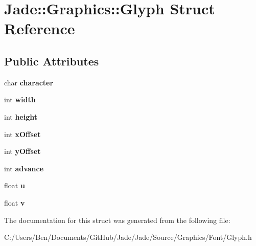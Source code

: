 \hypertarget{struct_jade_1_1_graphics_1_1_glyph}{}\section{Jade\+:\+:Graphics\+:\+:Glyph Struct Reference}
\label{struct_jade_1_1_graphics_1_1_glyph}
\subsection*{Public Attributes}
\begin{DoxyCompactItemize}
\item 
\hypertarget{struct_jade_1_1_graphics_1_1_glyph_af138396cfdec108c776fa599a14ba1e4}{}char {\bfseries character}\label{struct_jade_1_1_graphics_1_1_glyph_af138396cfdec108c776fa599a14ba1e4}

\item 
\hypertarget{struct_jade_1_1_graphics_1_1_glyph_a9b2276dc59b681731d0514a518fc672b}{}int {\bfseries width}\label{struct_jade_1_1_graphics_1_1_glyph_a9b2276dc59b681731d0514a518fc672b}

\item 
\hypertarget{struct_jade_1_1_graphics_1_1_glyph_a184d5d7e52652dedc12e22daf1aba744}{}int {\bfseries height}\label{struct_jade_1_1_graphics_1_1_glyph_a184d5d7e52652dedc12e22daf1aba744}

\item 
\hypertarget{struct_jade_1_1_graphics_1_1_glyph_a7622231925e54848d31ebbf3285bec61}{}int {\bfseries x\+Offset}\label{struct_jade_1_1_graphics_1_1_glyph_a7622231925e54848d31ebbf3285bec61}

\item 
\hypertarget{struct_jade_1_1_graphics_1_1_glyph_a5f16756ac11d5dfd697ad877c208dd96}{}int {\bfseries y\+Offset}\label{struct_jade_1_1_graphics_1_1_glyph_a5f16756ac11d5dfd697ad877c208dd96}

\item 
\hypertarget{struct_jade_1_1_graphics_1_1_glyph_a081f1bbf645e08811dea4bcf50a60c59}{}int {\bfseries advance}\label{struct_jade_1_1_graphics_1_1_glyph_a081f1bbf645e08811dea4bcf50a60c59}

\item 
\hypertarget{struct_jade_1_1_graphics_1_1_glyph_a83aa50d0eba411475adebb795d731b2e}{}float {\bfseries u}\label{struct_jade_1_1_graphics_1_1_glyph_a83aa50d0eba411475adebb795d731b2e}

\item 
\hypertarget{struct_jade_1_1_graphics_1_1_glyph_a3b15cafd58a0dd8b9aff8261e69e2946}{}float {\bfseries v}\label{struct_jade_1_1_graphics_1_1_glyph_a3b15cafd58a0dd8b9aff8261e69e2946}

\end{DoxyCompactItemize}


The documentation for this struct was generated from the following file\+:\begin{DoxyCompactItemize}
\item 
C\+:/\+Users/\+Ben/\+Documents/\+Git\+Hub/\+Jade/\+Jade/\+Source/\+Graphics/\+Font/Glyph.\+h\end{DoxyCompactItemize}
